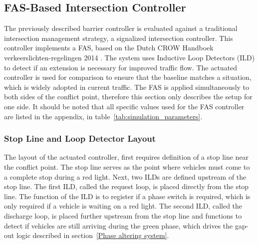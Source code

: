 
\subsection{FAS-Based Intersection Controller}
\label{Adaptive Traffic Control System}
The previously described barrier controller is evaluated against a traditional intersection management strategy, a signalized intersection controller. This controller implements a FAS, based on the Dutch CROW Handboek verkeerslichten-regelingen 2014 \parencite{wilson2014handboek}. The system uses Inductive Loop Detectors (ILD) to detect if an extension is necessary for improved traffic flow. The actuated controller is used for comparison to ensure that the baseline matches a situation, which is widely adopted in current traffic. The FAS is applied simultaneously to both sides of the conflict point, therefore this section only describes the setup for one side. It should be noted that all specific values used for the FAS controller are listed in the appendix, in table~\ref{tab:simulation_parameters}.

\subsubsection{Stop Line and Loop Detector Layout}
\label{Layout of FAS}
The layout of the actuated controller, first requires definition of
a stop line near the conflict point. The stop line serves as the point where vehicles must come to a complete stop during a red light. Next, two ILDs are defined upstream of the stop line. The first ILD, called the request loop, is placed directly from the stop line. The function of the ILD is to register if a phase switch is required, which is only required if a vehicle is waiting on a red light. The second ILD, called the discharge loop, is placed further upstream from the stop line and functions to detect if vehicles are still arriving during the green phase, which drives the gap-out logic described in section~\ref{Phase altering system}.

